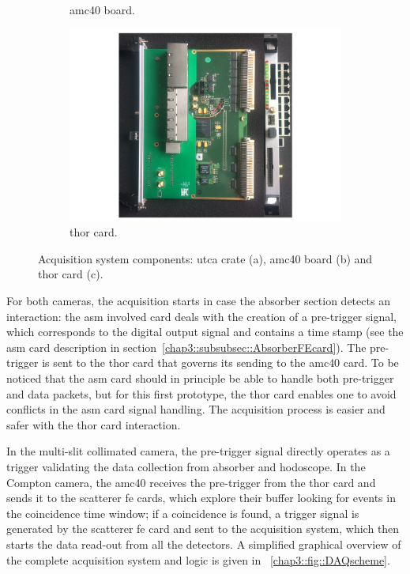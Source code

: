 \begin{figure}
\begin{subfigure}[htbp]{.41\textwidth}
\caption{\gls{amc}40 board.}
\label{chap3::fig::AMC40}
\end{subfigure}
\newline
\begin{subfigure}[b]{\textwidth}
\centering
\includegraphics[width=0.8\linewidth]{03_GraphicFiles/chapter3_CLaRySproto/Electronics_Acquisition/THOR.pdf}
\caption{\gls{thor} card.}
\label{chap3::fig::THOR}
\end{subfigure}
\caption{Acquisition system components: \gls{utca} crate (a), \gls{amc}40 board (b) and \gls{thor} card (c).}
\label{chap3::fig::AcquisitionSystem}
\end{figure}

For both cameras, the acquisition starts in case the absorber section detects an interaction: the \gls{asm} involved card deals with the creation of a pre-trigger signal, which corresponds to the digital output signal and contains a time stamp (see the \gls{asm} card description in section~\ref{chap3::subsubsec::AbsorberFEcard}). The pre-trigger is sent to the \gls{thor} card that governs its sending to the \gls{amc}40 card. To be noticed that the \gls{asm} card should in principle be able to handle both pre-trigger and data packets, but for this first prototype, the \gls{thor} card enables one to avoid conflicts in the \gls{asm} card signal handling. The acquisition process is easier and safer with the \gls{thor} card interaction. 
 
In the multi-slit collimated camera, the pre-trigger signal directly operates as a trigger validating the data collection from absorber and hodoscope. In the Compton camera, the \gls{amc}40 receives the pre-trigger from the \gls{thor} card and sends it to the scatterer \gls{fe} cards, which explore their buffer looking for events in the coincidence time window; if a coincidence is found, a trigger signal is generated by the scatterer \gls{fe} card and sent to the acquisition system, which then starts the data read-out from all the detectors. A simplified graphical overview of the complete acquisition system and logic is given in \figurename~\ref{chap3::fig::DAQscheme}.

